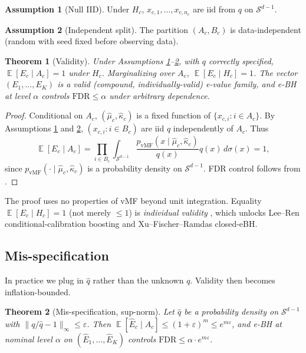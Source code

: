 \documentclass{article}
\newtheorem{theorem}{Theorem}
\theoremstyle{definition}
\newtheorem{assumption}{Assumption}
\theoremstyle{remark}
\DeclareMathOperator{\E}{\mathbb{E}}
\newcommand{\sphere}{\mathcal{S}^{d-1}}
\begin{document}
\begin{assumption}[Null IID]
\label{ass:null}
Under $H_c$, $x_{c,1}, \ldots, x_{c,n_c}$ are iid from $q$ on $\sphere$.
\end{assumption}

\begin{assumption}[Independent split]
\label{ass:split}
The partition $(A_c, B_c)$ is data-independent (random with seed fixed before observing data).
\end{assumption}

\begin{theorem}[Validity]
\label{thm:validity}
Under Assumptions \ref{ass:null}--\ref{ass:split}, with $q$ correctly specified, $\E[E_c \mid A_c] = 1$ under $H_c$. Marginalizing over $A_c$, $\E[E_c \mid H_c] = 1$. The vector $(E_1, \ldots, E_K)$ is a valid (compound, individually-valid) e-value family, and e-BH at level $\alpha$ controls $\mathrm{FDR} \le \alpha$ under arbitrary dependence.
\end{theorem}
\begin{proof}
Conditional on $A_c$, $(\hat\mu_c, \hat\kappa_c)$ is a fixed function of $\{x_{c,i} : i \in A_c\}$. By Assumptions \ref{ass:null} and \ref{ass:split}, $(x_{c,i} : i \in B_c)$ are iid $q$ independently of $A_c$. Thus
\[
\E[E_c \mid A_c] = \prod_{i \in B_c} \int_{\sphere} \frac{p_{\mathrm{vMF}}(x \mid \hat\mu_c, \hat\kappa_c)}{q(x)} q(x) \, d\sigma(x) = 1,
\]
since $p_{\mathrm{vMF}}(\cdot \mid \hat\mu_c, \hat\kappa_c)$ is a probability density on $\sphere$. FDR control follows from \citet{wangramdas2022}.
\end{proof}

The proof uses no properties of vMF beyond unit integration. Equality $\E[E_c \mid H_c] = 1$ (not merely $\le 1$) is \emph{individual validity} \citep{leeren2024}, which unlocks Lee--Ren conditional-calibration boosting and Xu--Fischer--Ramdas closed-eBH.

\subsection{Mis-specification}

In practice we plug in $\hat q$ rather than the unknown $q$. Validity then becomes inflation-bounded.

\begin{theorem}[Mis-specification, sup-norm]
\label{thm:supnorm}
Let $\hat q$ be a probability density on $\sphere$ with $\|q/\hat q - 1\|_\infty \le \varepsilon$. Then $\E[\hat E_c \mid A_c] \le (1 + \varepsilon)^m \le e^{m\varepsilon}$, and e-BH at nominal level $\alpha$ on $(\hat E_1, \ldots, \hat E_K)$ controls $\mathrm{FDR} \le \alpha \cdot e^{m\varepsilon}$.
\end{theorem}
\end{document}
